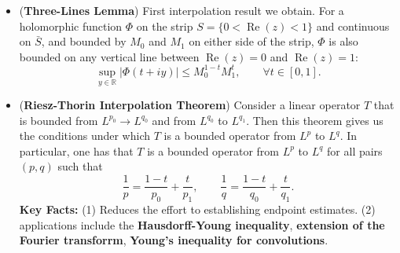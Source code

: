 \documentclass{article}
\begin{document}
\begin{itemize}
	\item (\textbf{Three-Lines Lemma}) First interpolation result we obtain. For a holomorphic function $\Phi$ on the strip $S = \{0 < \operatorname{Re}(z) < 1\}$ and continuous on $\bar{S}$, and bounded by $M_{0}$ and $M_{1}$ on either side of the strip, $\Phi$ is also bounded on any vertical line between $\operatorname{Re}(z) = 0$ and $\operatorname{Re}(z) = 1$: 
	\begin{equation*}
		\sup_{y \in \mathbb{R}}|\Phi(t + iy)| \leq M_{0}^{1 - t}M_{1}^{t}, \qquad \forall t \in [0,1]. 
	\end{equation*} 
	
	\item (\textbf{Riesz-Thorin Interpolation Theorem}) Consider a linear operator $T$ that is bounded from $L^{p_{0}} \to L^{q_{0}}$ and from $L^{q_{0}}$ to $L^{q_{1}}$. Then this theorem gives us the conditions under which $T$ is a bounded operator from $L^{p}$ to $L^{q}$. In particular, one has that $T$ is a bounded operator from $L^{p}$ to $L^{q}$ for all pairs $(p, q)$ such that 
	\begin{equation*}
		\frac{1}{p} = \frac{1 - t}{p_{0}} + \frac{t}{p_{1}}, \qquad \frac{1}{q} = \frac{1 - t}{q_{0}} + \frac{t}{q_{1}}. 
	\end{equation*} 
	\textbf{Key Facts:} (1) Reduces the effort to establishing endpoint estimates. (2) applications include the \textbf{Hausdorff-Young inequality}, \textbf{extension of the Fourier transforrm}, \textbf{Young's inequality for convolutions}. 
\end{itemize}

\newpage 
\end{document}
